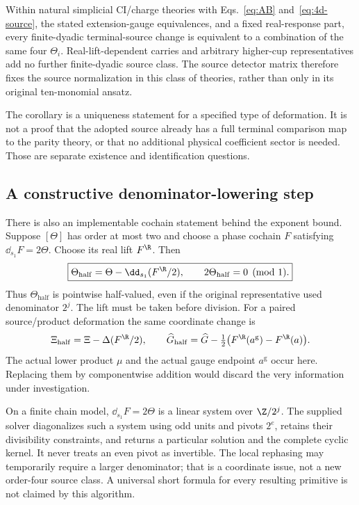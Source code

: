 \begin{corollary}\label{cor:real-source05}
Within natural simplicial CI/charge theories with Eqs.~\eqref{eq:AB} and~\eqref{eq:4d-source}, the stated extension-gauge equivalences, and a fixed real-response part, every finite-dyadic terminal-source change is equivalent to a combination of the same four $\Theta_i$. Real-lift-dependent carries and arbitrary higher-cup representatives add no further finite-dyadic source class. The source detector matrix therefore fixes the source normalization in this class of theories, rather than only in its original ten-monomial ansatz.
\end{corollary}
The corollary is a uniqueness statement for a specified type of deformation. It is not a proof that the adopted source already has a full terminal comparison map to the parity theory, or that no additional physical coefficient sector is needed. Those are separate existence and identification questions.


\subsection{A constructive denominator-lowering step}
There is also an implementable cochain statement behind the exponent bound. Suppose $[\Theta]$ has order at most two and choose a phase cochain $F$ satisfying $\dd_{s_1}F=2\Theta$. Choose its real lift $F^{\R}$. Then
\begin{equation}\label{eq:halving05}
 \boxed{\Theta_{\mathrm{half}}
 =\Theta-\dd_{s_1}(F^{\R}/2),\qquad
 2\Theta_{\mathrm{half}}=0\pmod1.}
\end{equation}
Thus $\Theta_{\mathrm{half}}$ is pointwise half-valued, even if the original representative used denominator $2^j$. The lift must be taken before division. For a paired source/product deformation the same coordinate change is
\begin{equation}\label{eq:paired-halving05}
 \Xi_{\mathrm{half}}=\Xi-\Delta(F^{\R}/2),\qquad
 \widehat G_{\mathrm{half}}=\widehat G-\tfrac12\big(F^{\R}(a^{\mathrm g})-F^{\R}(a)\big).
\end{equation}
The actual lower product $\mu$ and the actual gauge endpoint $a^{\mathrm g}$ occur here. Replacing them by componentwise addition would discard the very information under investigation.

On a finite chain model, $\dd_{s_1}F=2\Theta$ is a linear system over $\Z/2^j$. The supplied solver diagonalizes such a system using odd units and pivots $2^e$, retains their divisibility constraints, and returns a particular solution and the complete cyclic kernel. It never treats an even pivot as invertible. The local rephasing may temporarily require a larger denominator; that is a coordinate issue, not a new order-four source class. A universal short formula for every resulting primitive is not claimed by this algorithm.

